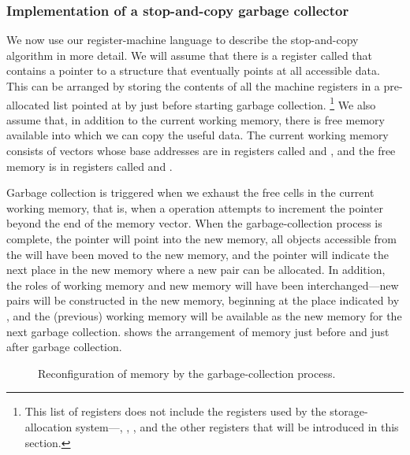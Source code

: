 \subsubsection*{Implementation of a stop-and-copy garbage collector}

We now use our register-machine language to describe the stop-and-copy algorithm in more detail.
We will assume that there is a register called  that contains a pointer to a structure that eventually points at all accessible data.
This can be arranged by storing the contents of all the machine registers in a pre-allocated list pointed at by  just before starting garbage collection.%
\footnote{
	This list of registers does not include the registers used by the storage-allocation system---, , , and the other registers that will be introduced in this section.
}
	We also assume that, in addition to the current working memory, there is free memory available into which we can copy the useful data.
	The current working memory consists of vectors whose base addresses are in registers called  and , and the free memory is in registers called  and .

Garbage collection is triggered when we exhaust the free cells in the current working memory, that is, when a  operation attempts to increment the  pointer beyond the end of the memory vector.
When the garbage-collection process is complete, the  pointer will point into the new memory, all objects accessible from the  will have been moved to the new memory, and the  pointer will indicate the next place in the new memory where a new pair can be allocated.
In addition, the roles of working memory and new memory will have been interchanged---new pairs will be constructed in the new memory, beginning at the place indicated by , and the (previous) working memory will be available as the new memory for the next garbage collection.
 shows the arrangement of memory just before and just after garbage collection.

\begin{figure}[tp]
	\centering
	
	\caption{
		Reconfiguration of memory by the garbage-collection process.
	}
	\label{Figure 5.15}
\end{figure}

